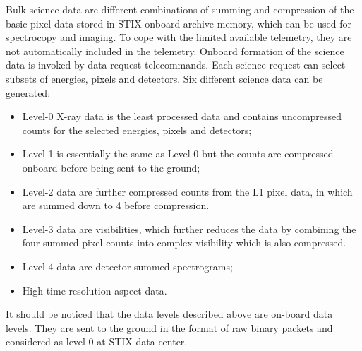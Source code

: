 \documentclass[referee]{aa} %
\begin{document}
Bulk science data are different combinations of summing and compression of the basic pixel data stored in STIX onboard archive memory, which can be used for spectrocopy and imaging.
To cope with the limited available telemetry, they are not automatically included in the telemetry.
Onboard formation of the science data is invoked by data request telecommands.
Each science request can select subsets of energies, pixels and detectors.
Six different science data can be generated:
\begin{itemize}
 \item Level-0 X-ray data is the least processed data and contains uncompressed counts for the selected energies, pixels and detectors;
\item Level-1 is essentially the same as Level-0 but the counts are compressed onboard before being sent to the ground;
\item Level-2 data are further compressed counts from the L1 pixel data, in which are summed down to 4 before compression.
\item Level-3 data are visibilities, which further reduces the data by combining the four summed pixel counts into complex visibility which is also compressed.
\item Level-4 data are detector summed spectrograms;
\item High-time resolution aspect data.
\end{itemize}
It should be noticed that the data levels described 
above are on-board data levels. They are sent to the ground in the format of raw binary packets and 
considered as level-0 at STIX data center.  
\begin{table}[h]
\centering
\caption{STIX raw telemetry data coverage, data rate and typical reception delay at SDC.  }
\label{tb:raw_types}
\end{table}
\end{document}
